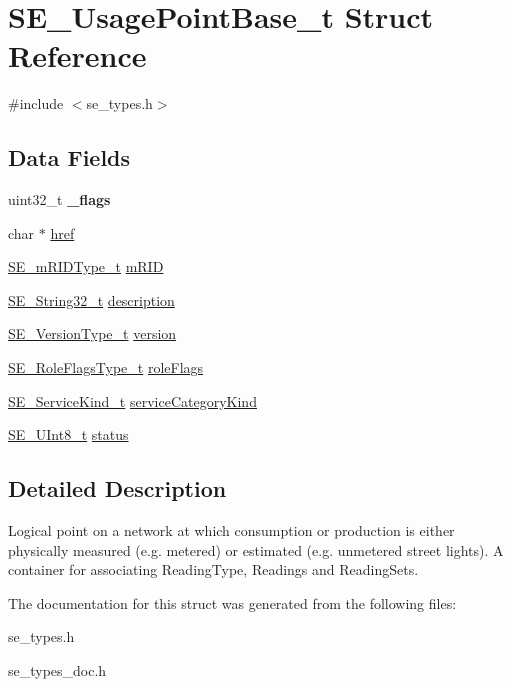 \hypertarget{structSE__UsagePointBase__t}{}\section{S\+E\+\_\+\+Usage\+Point\+Base\+\_\+t Struct Reference}
\label{structSE__UsagePointBase__t}


{\ttfamily \#include $<$se\+\_\+types.\+h$>$}

\subsection*{Data Fields}
\begin{DoxyCompactItemize}
\item 
uint32\+\_\+t {\bfseries \+\_\+flags}
\item 
char $\ast$ \hyperlink{group__UsagePointBase_ga6c126f5b6370940f33b5ee3b1c8e276b}{href}
\item 
\hyperlink{group__mRIDType_gac74622112f3a388a2851b2289963ba5e}{S\+E\+\_\+m\+R\+I\+D\+Type\+\_\+t} \hyperlink{group__UsagePointBase_gaba28fa565fb1533854f42c17887fc69a}{m\+R\+ID}
\item 
\hyperlink{group__String32_gac9f59b06b168b4d2e0d45ed41699af42}{S\+E\+\_\+\+String32\+\_\+t} \hyperlink{group__UsagePointBase_gabfbb1effbbe5fd8f045208410f1d73a4}{description}
\item 
\hyperlink{group__VersionType_ga4b8d27838226948397ed99f67d46e2ae}{S\+E\+\_\+\+Version\+Type\+\_\+t} \hyperlink{group__UsagePointBase_gadfbfb6da5311e41818e8d9df8109c4b6}{version}
\item 
\hyperlink{group__RoleFlagsType_gac20b70bba5dd7d6773b13d69c372c957}{S\+E\+\_\+\+Role\+Flags\+Type\+\_\+t} \hyperlink{group__UsagePointBase_ga3e4b9238ad11c245c622b2a7bb5bbf6c}{role\+Flags}
\item 
\hyperlink{group__ServiceKind_ga19a788255c7eeda579474fc6f3cc0810}{S\+E\+\_\+\+Service\+Kind\+\_\+t} \hyperlink{group__UsagePointBase_ga17715cd7dae4aee1bf4b42dd3e43ebf9}{service\+Category\+Kind}
\item 
\hyperlink{group__UInt8_gaf7c365a1acfe204e3a67c16ed44572f5}{S\+E\+\_\+\+U\+Int8\+\_\+t} \hyperlink{group__UsagePointBase_gac5ad1f28ffeedfbbe4348b73d1ad02aa}{status}
\end{DoxyCompactItemize}


\subsection{Detailed Description}
Logical point on a network at which consumption or production is either physically measured (e.\+g. metered) or estimated (e.\+g. unmetered street lights). A container for associating Reading\+Type, Readings and Reading\+Sets. 

The documentation for this struct was generated from the following files\+:\begin{DoxyCompactItemize}
\item 
se\+\_\+types.\+h\item 
se\+\_\+types\+\_\+doc.\+h\end{DoxyCompactItemize}
